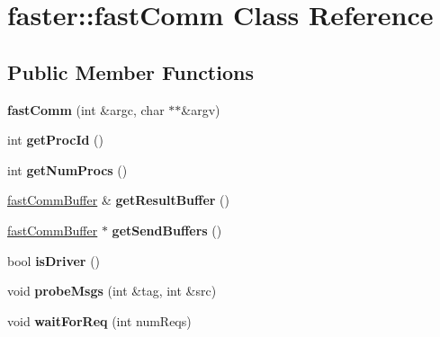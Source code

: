 \hypertarget{classfaster_1_1fastComm}{}\section{faster\+:\+:fast\+Comm Class Reference}
\label{classfaster_1_1fastComm}
\subsection*{Public Member Functions}
\begin{DoxyCompactItemize}
\item 
\hypertarget{classfaster_1_1fastComm_a0713b3e344c95ccf898738729762c7d2}{}{\bfseries fast\+Comm} (int \&argc, char $\ast$$\ast$\&argv)\label{classfaster_1_1fastComm_a0713b3e344c95ccf898738729762c7d2}

\item 
\hypertarget{classfaster_1_1fastComm_abc2ab1663dab2076556a165b2b709400}{}int {\bfseries get\+Proc\+Id} ()\label{classfaster_1_1fastComm_abc2ab1663dab2076556a165b2b709400}

\item 
\hypertarget{classfaster_1_1fastComm_adb5362e1b299df2bc3753dea326f603d}{}int {\bfseries get\+Num\+Procs} ()\label{classfaster_1_1fastComm_adb5362e1b299df2bc3753dea326f603d}

\item 
\hypertarget{classfaster_1_1fastComm_a8f53072a54ba41fa2854dd829312f1c9}{}\hyperlink{classfaster_1_1fastCommBuffer}{fast\+Comm\+Buffer} \& {\bfseries get\+Result\+Buffer} ()\label{classfaster_1_1fastComm_a8f53072a54ba41fa2854dd829312f1c9}

\item 
\hypertarget{classfaster_1_1fastComm_acd4b18c158437d46b8bfa5e6b1077d29}{}\hyperlink{classfaster_1_1fastCommBuffer}{fast\+Comm\+Buffer} $\ast$ {\bfseries get\+Send\+Buffers} ()\label{classfaster_1_1fastComm_acd4b18c158437d46b8bfa5e6b1077d29}

\item 
\hypertarget{classfaster_1_1fastComm_afab41f8b143b49d41150707b1665f33a}{}bool {\bfseries is\+Driver} ()\label{classfaster_1_1fastComm_afab41f8b143b49d41150707b1665f33a}

\item 
\hypertarget{classfaster_1_1fastComm_ae4989c905340be092381e00f2166d9bc}{}void {\bfseries probe\+Msgs} (int \&tag, int \&src)\label{classfaster_1_1fastComm_ae4989c905340be092381e00f2166d9bc}

\item 
\hypertarget{classfaster_1_1fastComm_a5a539bee13feec7bcb48d2aca3811bff}{}void {\bfseries wait\+For\+Req} (int num\+Reqs)\label{classfaster_1_1fastComm_a5a539bee13feec7bcb48d2aca3811bff}


\end{DoxyCompactItemize}
